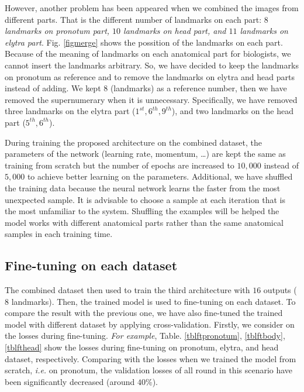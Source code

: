 \documentclass[review]{elsarticle}
\begin{document}
However, another problem has been appeared when we combined the images from different parts. That is the different number of landmarks on each part: \textit{$8$ landmarks on pronotum part, $10$ landmarks on head part, and $11$ landmarks on elytra part}. Fig. \ref{figmerge} shows the possition of the landmarks on each part. Because of the meaning of landmarks on each anatomical part for biologists, we cannot insert the landmarks arbitrary. So, we have decided to keep the landmarks on pronotum as reference and to remove the landmarks on elytra and head parts instead of adding. We kept $8$ (landmarks) as a reference number, then we have removed the supernumerary when it is unnecessary. Specifically, we have removed three landmarks on the elytra part ($1^{st}, 6^{th}, 9^{th}$), and two landmarks on the head part ($5^{th}, 6^{th}$). 

During training the proposed architecture on the combined dataset, the parameters of the network (learning rate, momentum, \ldots) are kept the same as training from scratch but the number of epochs are increased to $10, 000$ instead of $5, 000$ to achieve better learning on the parameters. Additional, we have shuffled the training data because the neural network learns the faster from the most unexpected sample. It is advisable to choose a sample at each iteration that is the most unfamiliar to the system. Shuffling the examples will be helped the model works with different anatomical parts rather than the same anatomical samples in each training time.

\subsection{Fine-tuning on each dataset}
The combined dataset then used to train the third architecture with $16$ outputs ($8$ landmarks). Then, the trained model is used to fine-tuning on each dataset. To compare the result with the previous one, we have also fine-tuned the trained model with different dataset by applying cross-validation. Firstly, we consider on the losses during fine-tuning. \textit{For example}, Table. \ref{tblftpronotum}, \ref{tblftbody}, \ref{tblfthead} show the losses during fine-tuning on pronotum, elytra, and head dataset, respectively. Comparing with the losses when we trained the model from scratch, \textit{i.e.} on pronotum, the validation losses of all round in this scenario have been significantly decreased (around $40\%$).
\end{document}
